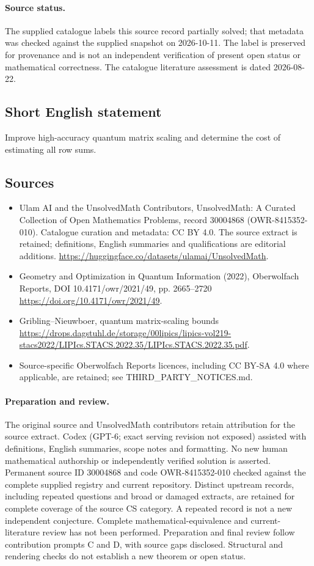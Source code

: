 \documentclass[11pt]{article}
\begin{document}
\paragraph{Source status.}
The supplied catalogue labels this source record partially solved; that metadata was checked against the supplied snapshot on 2026-10-11. The label is preserved for provenance and is not an independent verification of present open status or mathematical correctness. The catalogue literature assessment is dated 2026-08-22.
\subsection{Short English statement}
Improve high-accuracy quantum matrix scaling and determine the cost of estimating all row sums.
\subsection{Sources}
\begin{itemize}
\item[\hypertarget{source:30004868:1}{S1}] Ulam AI and the UnsolvedMath Contributors, UnsolvedMath: A Curated Collection of Open Mathematics Problems, record 30004868 (OWR-8415352-010). Catalogue curation and metadata: CC BY 4.0. The source extract is retained; definitions, English summaries and qualifications are editorial additions.
\url{https://huggingface.co/datasets/ulamai/UnsolvedMath}.
\item[\hypertarget{source:30004868:2}{S2}] Geometry and Optimization in Quantum Information (2022), Oberwolfach Reports, DOI 10.4171/owr/2021/49, pp. 2665--2720
\url{https://doi.org/10.4171/owr/2021/49}.
\item[\hypertarget{source:30004868:3}{S3}] Gribling--Nieuwboer, quantum matrix-scaling bounds
\url{https://drops.dagstuhl.de/storage/00lipics/lipics-vol219-stacs2022/LIPIcs.STACS.2022.35/LIPIcs.STACS.2022.35.pdf}.
\item Source-specific Oberwolfach Reports licences, including CC BY-SA 4.0 where applicable, are retained; see THIRD\_PARTY\_NOTICES.md.
\end{itemize}
\paragraph{Preparation and review.}
The original source and UnsolvedMath contributors retain attribution for the source extract. Codex (GPT-6; exact serving revision not exposed) assisted with definitions, English summaries, scope notes and formatting. No new human mathematical authorship or independently verified solution is asserted. Permanent source ID 30004868 and code OWR-8415352-010 checked against the complete supplied registry and current repository. Distinct upstream records, including repeated questions and broad or damaged extracts, are retained for complete coverage of the source CS category. A repeated record is not a new independent conjecture. Complete mathematical-equivalence and current-literature review has not been performed. Preparation and final review follow contribution prompts C and D, with source gaps disclosed. Structural and rendering checks do not establish a new theorem or open status.
\label{end:30004868}
\end{document}

